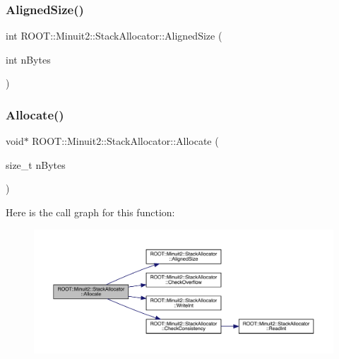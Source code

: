 \subsubsection{\texorpdfstring{AlignedSize()}{AlignedSize()}\hspace{0.1cm}{\footnotesize\ttfamily [2/2]}}
{\footnotesize\ttfamily int R\+O\+O\+T\+::\+Minuit2\+::\+Stack\+Allocator\+::\+Aligned\+Size (\begin{DoxyParamCaption}\item[{int}]{n\+Bytes }\end{DoxyParamCaption})\hspace{0.3cm}{\ttfamily [inline]}}

\mbox{\label{classROOT_1_1Minuit2_1_1StackAllocator_a1fb4d1744055446776080af229679e03}} 
\subsubsection{\texorpdfstring{Allocate()}{Allocate()}\hspace{0.1cm}{\footnotesize\ttfamily [1/2]}}
{\footnotesize\ttfamily void$\ast$ R\+O\+O\+T\+::\+Minuit2\+::\+Stack\+Allocator\+::\+Allocate (\begin{DoxyParamCaption}\item[{size\+\_\+t}]{n\+Bytes }\end{DoxyParamCaption})\hspace{0.3cm}{\ttfamily [inline]}}

Here is the call graph for this function\+:
\nopagebreak
\begin{figure}[H]
\begin{center}
\leavevmode
\includegraphics[width=350pt]{d3/d1e/classROOT_1_1Minuit2_1_1StackAllocator_a1fb4d1744055446776080af229679e03_cgraph}
\end{center}
\end{figure}
\mbox{\label{classROOT_1_1Minuit2_1_1StackAllocator_a1fb4d1744055446776080af229679e03}} 
